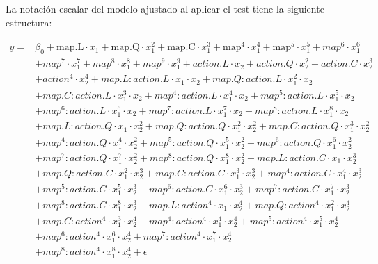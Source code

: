\documentclass[10pt,a4paper]{article}
\begin{document}

La notación escalar del modelo ajustado al aplicar el test tiene la siguiente estructura:

\begin{equation}
\begin{split}
    y = {} & \beta_0 + \mbox{map.L} \cdot x_1 + \mbox{map.Q} \cdot x_1^2 + \mbox{map.C} \cdot x_1^3 + \mbox{map}^4 \cdot x_1^4 + \mbox{map}^5 \cdot x_1^5 + map^6 \cdot x_1^6
\\ & + map^7 \cdot x_1^7 + map^8 \cdot x_1^8 + map^9 \cdot x_1^9 + action.L \cdot x_2 + action.Q \cdot x_2^2 + action.C \cdot x_2^3
\\ &+ action^4 \cdot x_2^4 + map.L:action.L \cdot  x_1 \cdot x_2 + map.Q:action.L \cdot  x_1^2 \cdot x_2 \\ & + map.C:action.L \cdot  x_1^3 \cdot x_2 + map^4:action.L \cdot  x_1^4 \cdot x_2 + map^5:action.L \cdot  x_1^5 \cdot x_2 \\ & + map^6:action.L \cdot  x_1^6 \cdot x_2 + map^7:action.L \cdot  x_1^7 \cdot x_2 + map^8:action.L \cdot  x_1^8 \cdot x_2 \\ & + map.L:action.Q \cdot  x_1 \cdot x_2^2 + map.Q:action.Q \cdot  x_1^2 \cdot x_2^2 + map.C:action.Q \cdot  x_1^3 \cdot x_2^2 \\ & + map^4:action.Q \cdot  x_1^4 \cdot x_2^2 + map^5:action.Q \cdot  x_1^5 \cdot x_2^2 + map^6:action.Q \cdot  x_1^6 \cdot x_2^2 \\ & + map^7:action.Q \cdot  x_1^7 \cdot x_2^2 + map^8:action.Q \cdot  x_1^8 \cdot x_2^2 + map.L:action.C \cdot  x_1 \cdot x_2^3 \\ & + map.Q:action.C \cdot  x_1^2 \cdot x_2^3 + map.C:action.C \cdot  x_1^3 \cdot x_2^3  + map^4:action.C \cdot  x_1^4 \cdot x_2^3 \\ & + map^5:action.C \cdot  x_1^5 \cdot x_2^3 + map^6:action.C \cdot  x_1^6 \cdot x_2^3 + map^7:action.C \cdot  x_1^7 \cdot x_2^3 \\ & + map^8:action.C \cdot  x_1^8 \cdot x_2^3 + map.L:action^4 \cdot  x_1 \cdot x_2^4 + map.Q:action^4 \cdot  x_1^2 \cdot x_2^4 \\ & + map.C:action^4 \cdot  x_1^3 \cdot x_2^4 + map^4:action^4 \cdot  x_1^4 \cdot x_2^4 + map^5:action^4 \cdot  x_1^5 \cdot x_2^4 \\ & + map^6:action^4 \cdot  x_1^6 \cdot x_2^4 + map^7:action^4 \cdot  x_1^7 \cdot x_2^4 \\ & + map^8:action^4 \cdot  x_1^8 \cdot x_2^4 + \epsilon
\end{split}
\label{eq1}
\end{equation}
\end{document}
